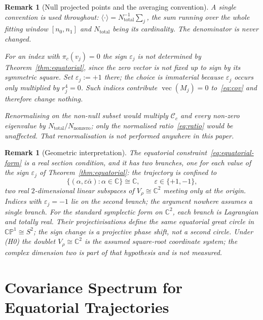 \documentclass[11pt,a4paper]{article}
\newtheorem{remark}[theorem]{Remark}
\newcommand{\Cc}{\mathcal{C}_c}
\begin{document}
  \begin{remark}[Null projected points and the averaging convention]
    \label{rem:null}
    A single convention is used throughout:
    $\langle \cdot \rangle = N_{\mathrm{total}}^{-1} \sum_j$, the sum running over the whole fitting
    window $[n_0, n_1]$ and $N_{\mathrm{total}}$ being its cardinality.
    The denominator is never changed.

    For an index with $\pi_c(v_j) = 0$ the sign $\varepsilon_j$ is not determined by
    Theorem~\ref{thm:equatorial}, since the zero vector is not fixed up to sign by its symmetric
    square.
    Set $\varepsilon_j := +1$ there; the choice is immaterial because $\varepsilon_j$
    occurs only multiplied by $r_j^4 = 0$.
    Such indices contribute $\operatorname{vec}(M_j) = 0$ to~\eqref{eq:cov} and therefore change
    nothing.

    Renormalising on the non-null subset would multiply $\Cc$ and every non-zero eigenvalue by
    $N_{\mathrm{total}}/N_{\mathrm{nonzero}}$; only the normalised ratio~\eqref{eq:ratio} would be
    unaffected.
    That renormalisation is not performed anywhere in this paper.
  \end{remark}

  \begin{remark}[Geometric interpretation]
    \label{rem:geometry}
    The equatorial constraint~\eqref{eq:equatorial-form} is a \emph{real section} condition, and it
    has two branches, one for each value of the sign $\varepsilon_j$ of
    Theorem~\ref{thm:equatorial}: the trajectory is confined to
    \[
      \{(\alpha, \varepsilon\bar\alpha) : \alpha \in \mathbb{C}\} \cong \mathbb{C},
      \qquad \varepsilon \in \{+1, -1\},
    \]
    two real $2$-dimensional linear subspaces of $V_\rho \cong \mathbb{C}^2$ meeting only at the origin.
    Indices with $\varepsilon_j = -1$ lie on the second branch; the argument nowhere assumes a single
    branch.
    For the standard symplectic form on $\mathbb{C}^2$, each branch is Lagrangian and totally real.
    Their projectivisations define the same equatorial great circle in
    $\mathbb{CP}^1 \cong S^2$; the sign change is a projective phase shift, not a second circle.
    Under (H0) the doublet $V_\rho \cong \mathbb{C}^2$ is the assumed square-root coordinate system;
    the complex dimension two is part of that hypothesis and is not measured.
  \end{remark}

  \section{Covariance Spectrum for Equatorial Trajectories}
  \label{sec:spectrum}
\end{document}

